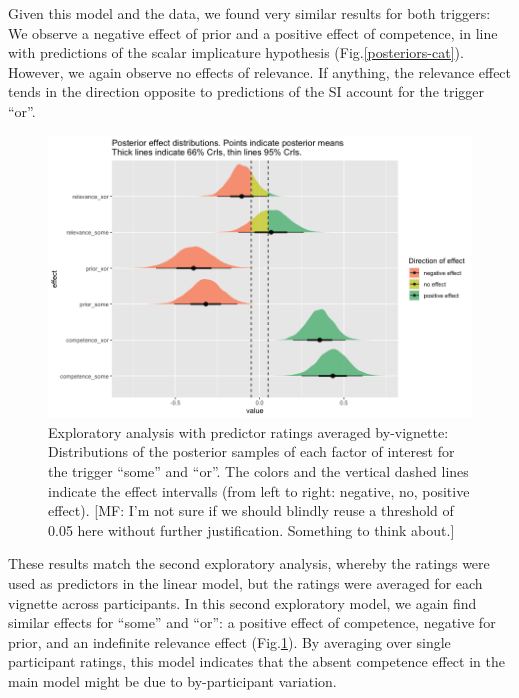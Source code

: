\documentclass{sp}
\newcommand{\mf}[1]{\textcolor{BurntOrange}{[MF: #1]}}
\begin{document}
Given this model and the data, we found very similar results for both triggers: We observe a negative effect of prior and a positive effect of competence, in line with predictions of the scalar implicature hypothesis (Fig.\ref{posteriors-cat}). However, we again observe no effects of relevance. If anything, the relevance effect tends in the direction opposite to predictions of the SI account for the trigger ``or''. 
\begin{figure}[t]
	\begin{center}
		\includegraphics[width=1\linewidth]{images/posterior-effects-means.png}
	\end{center}
	\vspace{-0.3cm}
	\caption{Exploratory analysis with predictor ratings averaged by-vignette: Distributions of the posterior samples of each factor of interest for the trigger ``some'' and ``or''. The colors and the vertical dashed lines indicate the effect intervalls (from left to right: negative, no, positive effect). \mf{I'm not sure if we should blindly reuse a threshold of 0.05 here without further justification. Something to think about.}}
	\label{posteriors-mean}
\end{figure}

These results match the second exploratory analysis, whereby the ratings were used as predictors in the linear model, but the ratings were averaged for each vignette across participants. In this second  exploratory model, we again find similar effects for ``some'' and ``or'': a positive effect of competence, negative for prior, and an indefinite relevance effect (Fig.\ref{posteriors-mean}). By averaging over single participant ratings, this model indicates that the absent competence effect in the main model might be due to by-participant variation.
\end{document}
